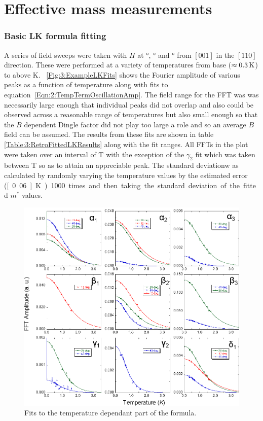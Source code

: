 
\section{Effective mass measurements}


\subsubsection{Basic LK formula fitting}

A series of field sweeps were taken with $H$ at \unit[12]{\degree}, \unit[28]{\degree} and \unit[46]{\degree} from $[001]$ in the $[110]$ direction. These were performed at a variety of temperatures from base ($\approx\unit[0.3]{K}$) to above \unit[2]{K}. \Fig~\ref{Fig:3:ExampleLKFits} shows the Fourier amplitude of various peaks as a function of temperature along with fits to equation~\ref{Eqn:2:TempTermOscillationAmp}. The field range for the FFT was was necessarily large enough that individual peaks did not overlap and also could be observed across a reasonable range of temperatures but also small enough so that the $B$ dependent Dingle factor did not play too large a role and so an average $B$ field can be assumed. The results from these fits are shown in table \ref{Table:3:RetroFittedLKResults} along with the fit ranges. All FFTs in the plot were taken over an interval of \unit[12--18]{T} with the exception of the $\gamma_2$ fit which was taken between \unit[16-18]{T} so as to attain an appreciable peak. The standard deviationw as calculated by randomly varying the temperature values by the estimated error (\unit[0.06]{K}) 1000 times and then taking the standard deviation of the fitted $m^*$ values.
\begin{figure}[h!]
    \begin{center}
        \includegraphics[scale=0.7]{Chapter3-dHvABaFe2P2/Figures/Mass/SimpleLKFits/SimpleLKFits}
        \caption{Fits to the temperature dependant part of the \LK formula. }
        \label{Fig:3:SimpleLKFits}
    \end{center}
\end{figure}

